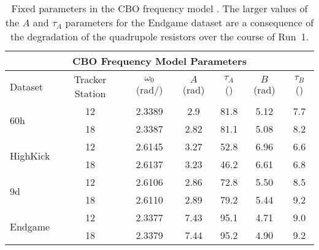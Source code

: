 \begin{table}
\centering
\small
\setlength\tabcolsep{10pt}
\renewcommand{\arraystretch}{1.2}
\begin{tabular*}{1\linewidth}{@{\extracolsep{\fill}}lcccccc}
  \hline
    \multicolumn{7}{c}{\textbf{CBO Frequency Model Parameters}} \\
  \hline\hline
    Dataset & Tracker Station & $\omega_{0}$ (rad/\mus{}) & $A$ (rad) & $\tau_{A}$ (\mus{}) & $B$ (rad) & $\tau_{B}$ (\mus{}) \\
  \hline
    \multirow{2}{*}{60h} & 12 & 2.3389 & 2.9 & 81.8 & 5.12 & 7.7 \\
                         & 18 & 2.3387 & 2.82 & 81.1 & 5.08 & 8.2 \\
  \hline
    \multirow{2}{*}{HighKick} & 12 & 2.6145 & 3.27 & 52.8 & 6.96 & 6.6 \\
                              & 18 & 2.6137 & 3.23 & 46.2 & 6.61 & 6.8 \\
  \hline
    \multirow{2}{*}{9d} & 12 & 2.6106 & 2.86 & 72.8 & 5.50 & 8.5 \\
                        & 18 & 2.6110 & 2.89 & 79.2 & 5.44 & 9.2 \\
  \hline
    \multirow{2}{*}{Endgame} & 12 & 2.3377 & 7.43 & 95.1 & 4.71 & 9.0 \\
                             & 18 & 2.3379 & 7.44 & 95.2 & 4.90 & 9.2 \\                                                        
  \hline
\end{tabular*}
\caption[Dataset CBO frequency model parameters]{Fixed parameters in the CBO frequency model \cite{CBOFreqTrackingElog,JamesPersonalComm}. The larger values of the $A$ and $\tau_{A}$ parameters for the Endgame dataset are a consequence of the degradation of the quadrupole resistors over the course of Run~1.}
\label{tab:CBOFrequencyParameters}
\end{table}


